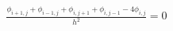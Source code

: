 \documentclass[preview]{standalone}
\begin{document}
\begin{align*}
\frac{\phi_{i+1,j} + \phi_{i-1,j} + \phi_{i,j+1} + \phi_{i,j-1} - 4\phi_{i,j}}{h^2} = 0
\end{align*}
\end{document}
